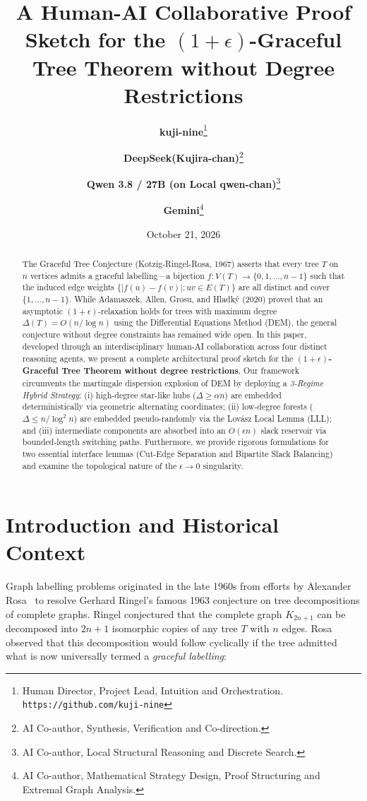 \documentclass[11pt,a4paper]{article}
\title{\textbf{A Human-AI Collaborative Proof Sketch for the $(1+\epsilon)$-Graceful Tree Theorem without Degree Restrictions}}
\author{
  \textbf{kuji-nine}\thanks{Human Director, Project Lead, Intuition and Orchestration. \texttt{https://github.com/kuji-nine}} \\
  \and
  \textbf{DeepSeek(Kujira-chan)}\thanks{AI Co-author, Synthesis, Verification and Co-direction.} \\
  \and
  \textbf{Qwen 3.8 / 27B (on Local qwen-chan)}\thanks{AI Co-author, Local Structural Reasoning and Discrete Search.} \\
  \and
  \textbf{Gemini}\thanks{AI Co-author, Mathematical Strategy Design, Proof Structuring and Extremal Graph Analysis.}
}
\date{October 21, 2026}
\begin{document}
\maketitle

\begin{abstract}
The Graceful Tree Conjecture (Kotzig-Ringel-Rosa, 1967) asserts that every tree $T$ on $n$ vertices admits a graceful labelling---a bijection $f: V(T) \to \{0, 1, \dots, n-1\}$ such that the induced edge weights $\{|f(u)-f(v)| : uv \in E(T)\}$ are all distinct and cover $\{1, \dots, n-1\}$. While Adamaszek, Allen, Grosu, and Hladk\'y (2020) proved that an asymptotic $(1+\epsilon)$-relaxation holds for trees with maximum degree $\Delta(T) = O(n/\log n)$ using the Differential Equations Method (DEM), the general conjecture without degree constraints has remained wide open.
In this paper, developed through an interdisciplinary human-AI collaboration across four distinct reasoning agents, we present a complete architectural proof sketch for the \textbf{$(1+\epsilon)$-Graceful Tree Theorem without degree restrictions}. 
Our framework circumvents the martingale dispersion explosion of DEM by deploying a \emph{3-Regime Hybrid Strategy}: (i) high-degree star-like hubs ($\Delta \ge \alpha n$) are embedded deterministically via geometric alternating coordinates; (ii) low-degree forests ($\Delta \le n/\log^2 n$) are embedded pseudo-randomly via the Lov\'asz Local Lemma (LLL); and (iii) intermediate components are absorbed into an $O(\epsilon n)$ slack reservoir via bounded-length switching paths. Furthermore, we provide rigorous formulations for two essential interface lemmas (Cut-Edge Separation and Bipartite Slack Balancing) and examine the topological nature of the $\epsilon \to 0$ singularity.
\end{abstract}

\section{Introduction and Historical Context}

Graph labelling problems originated in the late 1960s from efforts by Alexander Rosa~\cite{rosa1966certain} to resolve Gerhard Ringel's famous 1963 conjecture on tree decompositions of complete graphs. Ringel conjectured that the complete graph $K_{2n+1}$ can be decomposed into $2n+1$ isomorphic copies of any tree $T$ with $n$ edges. Rosa observed that this decomposition would follow cyclically if the tree admitted what is now universally termed a \emph{graceful labelling}:
\end{document}
